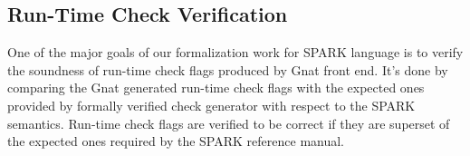 \subsection{Run-Time Check Verification}
One of the major goals of our formalization work for SPARK language is
to verify the soundness of run-time check flags produced by Gnat front
end. It's done by comparing the Gnat generated run-time check flags with the
expected ones provided by formally verified check generator with respect to the
SPARK semantics. Run-time check flags are verified to be correct if they are
superset of the expected ones required by the SPARK reference manual.











